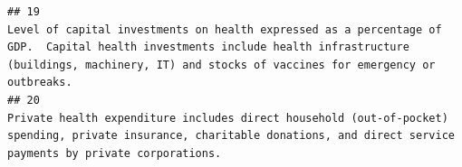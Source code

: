 \documentclass[
]{article}
\begin{document}
\begin{verbatim}
## 19                                                                                                                                                                                                                                                                                                                                                                                                                                                                                                                                                                                                                                                                                                                                                                                                                                                                                                                                                                                                                                                                                                                                                                                                                                  Level of capital investments on health expressed as a percentage of GDP.  Capital health investments include health infrastructure (buildings, machinery, IT) and stocks of vaccines for emergency or outbreaks.
## 20                                                                                                                                                                                                                                                                                                                                                                                                                                                                                                                                                                                                                                                                                                                                                                                                                                                                                                                                                                                                                                                                                                                                                                                                                                                                      Private health expenditure includes direct household (out-of-pocket) spending, private insurance, charitable donations, and direct service payments by private corporations.

\end{verbatim}
\end{document}
